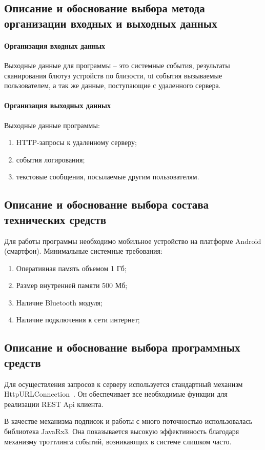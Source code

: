 \documentclass[explnote]{espd}
\begin{document}
\subsection{Описание и обоснование выбора метода организации входных и выходных данных}
\paragraph{Организация входных данных}
Выходные данные для программы -- это системные события, результаты сканирования блютуз устройств по близости, ui события вызываемые пользователем, а так же данные, поступающие с удаленного сервера.

\paragraph{Организация выходных данных}\label{paragraph:output}
Выходные данные программы:

\begin{enumerate}
\item HTTP-запросы к удаленному серверу;
\item события логирования;
\item текстовые сообщения, посылаемые другим пользователям.
\end{enumerate}

\subsection{Описание и обоснование выбора состава технических средств}
Для работы программы необходимо мобильное устройство на платформе Android (смартфон). Минимальные системные требования:

\begin{enumerate}
\item Оперативная память объемом 1 Гб;
\item Размер внутренней памяти 500 Мб;
\item Наличие Bluetooth модуля;
\item Наличие подключения к сети интернет;
\end{enumerate}

\subsection{Описание и обоснование выбора программных средств}
Для осуществления запросов к серверу используется стандартный механизм HttpURLConnection~\cite{httpUrl}. Он обеспечивает все необходимые функции для реализации REST Api клиента.

В качестве механизма подписок и работы с много поточностью использовалась библиотека JavaRx3. Она показывается высокую эффективность благодаря механизму троттлинга событий, возникающих в системе слишком часто. 


\end{document}
